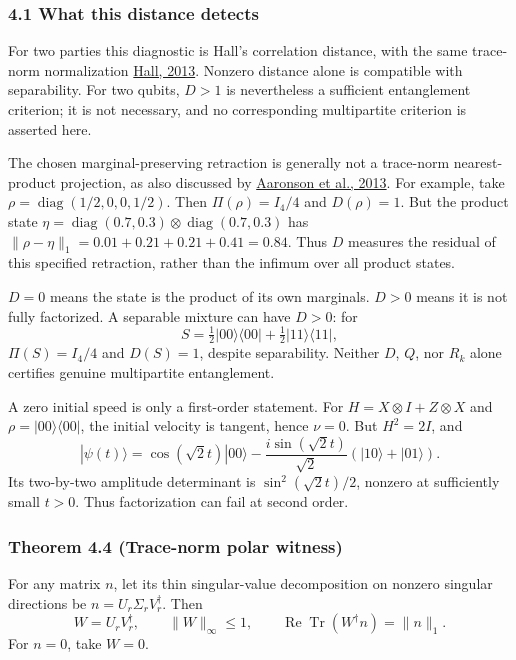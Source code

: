 \documentclass[
  11pt,
]{article}
\begin{document}
\subsubsection{4.1 What this distance detects}\label{what-this-distance-detects}

For two parties this diagnostic is Hall's correlation distance, with the
same trace-norm normalization \href{https://arxiv.org/html/1307.2697v1}{Hall, 2013}.
Nonzero distance alone is compatible with separability. For two qubits,
\(D>1\) is nevertheless a sufficient entanglement criterion; it is not
necessary, and no corresponding multipartite criterion is asserted here.

The chosen marginal-preserving retraction is generally not a trace-norm
nearest-product projection, as also discussed by
\href{https://arxiv.org/abs/1307.3953}{Aaronson et al., 2013}.
For example, take \(\rho=\operatorname{diag}(1/2,0,0,1/2)\).
Then \(\Pi(\rho)=I_4/4\) and \(D(\rho)=1\).
But the product state
\(\eta=\operatorname{diag}(0.7,0.3)\otimes\operatorname{diag}(0.7,0.3)\)
has \(\|\rho-\eta\|_1=0.01+0.21+0.21+0.41=0.84\).
Thus \(D\) measures the residual of this specified retraction, rather than
the infimum over all product states.

\(D=0\) means the state is the product of its own marginals.
\(D>0\) means it is not fully factorized.
A separable mixture can have \(D>0\): for
\[
S=\tfrac12|00\rangle\langle00|+\tfrac12|11\rangle\langle11|,
\]
\(\Pi(S)=I_4/4\) and \(D(S)=1\), despite separability.
Neither \(D\), \(Q\), nor \(R_k\) alone certifies genuine multipartite
entanglement.

A zero initial speed is only a first-order statement.
For \(H=X\otimes I+Z\otimes X\) and \(\rho=|00\rangle\langle00|\),
the initial velocity is tangent, hence \(\nu=0\). But \(H^2=2I\), and
\[
|\psi(t)\rangle
=\cos(\sqrt2t)|00\rangle
-\frac{i\sin(\sqrt2t)}{\sqrt2}(|10\rangle+|01\rangle).
\]
Its two-by-two amplitude determinant is
\(\sin^2(\sqrt2t)/2\), nonzero at sufficiently small \(t>0\).
Thus factorization can fail at second order.

\subsubsection{Theorem 4.4 (Trace-norm polar witness)}\label{theorem-4.4-trace-norm-polar-witness}

For any matrix \(n\), let its thin singular-value decomposition on nonzero
singular directions be \(n=U_r\Sigma_rV_r^\dagger\). Then
\[
W=U_rV_r^\dagger,\qquad
\|W\|_\infty\le1,\qquad
\operatorname{Re}\operatorname{Tr}(W^\dagger n)=\|n\|_1.
\]
For \(n=0\), take \(W=0\).
\end{document}
